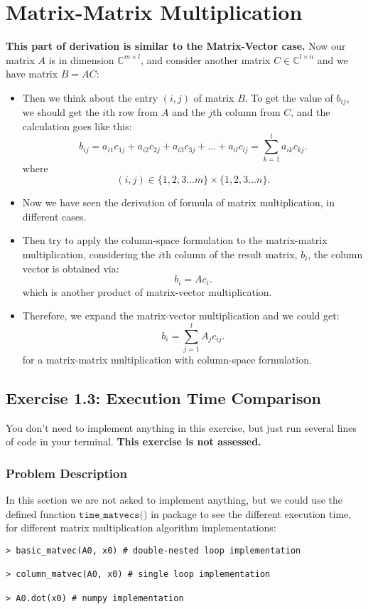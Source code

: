 \section{Matrix-Matrix Multiplication}%
\textbf{This part of derivation is similar to the Matrix-Vector case.} Now our matrix $A$ is in dimension $\mathbb{C}^{m \times l}$, and consider another matrix $C \in \mathbb{C}^{l \times n}$ and we have matrix $B = AC$:
\begin{itemize}
  \item Then we think about the entry $(i, j)$ of matrix $B$. To get the value of $b_{ij}$, we should get the $i$th row from $A$ and the $j$th column from $C$, and the calculation goes like this:
    \[
      b_{ij} = a_{i1}c_{1j} + a_{i2}c_{2j} + a_{i3}c_{3j} + \ldots +  a_{il}c_{lj} = \sum_{k = 1}^{l} a_{ik}c_{kj}
    .\] 
    where
    \[
      (i, j) \in \{1, 2, 3 \ldots m\} \times \{1, 2, 3 \ldots n\} 
    .\]
    \item Now we have seen the derivation of formula of matrix multiplication, in different cases.
    \item Then try to apply the column-space formulation to the matrix-matrix multiplication, considering the $i$th column of the result matrix, $b_i$, the column vector is obtained via:
    \[
    b_i = A c_i
    .\] 
    which is another product of matrix-vector multiplication.
    \item Therefore, we expand the matrix-vector multiplication and we could get:
    \[
    b_i = \sum_{j=1}^{l} A_j c_{ij}
    .\]
    for a matrix-matrix multiplication with column-space formulation.

\end{itemize}
\subsection*{Exercise 1.3: Execution Time Comparison}%
You don't need to implement anything in this exercise, but just run several lines of code in your terminal. \textbf{This exercise is not assessed.}
\subsubsection*{Problem Description}
In this section we are not asked to implement anything, but we could use the defined function $\texttt{time\_matvecs()}$ in package to see the different execution time, for different matrix multiplication algorithm implementations:
\begin{lstlisting}
> basic_matvec(A0, x0) # double-nested loop implementation

> column_matvec(A0, x0) # single loop implementation

> A0.dot(x0) # numpy implementation
\end{lstlisting}

